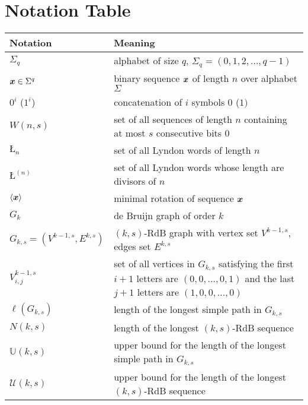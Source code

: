 \chapter*{Notation Table} 
\begin{center}
    \begin{tabular}{| m{2.5cm} | m{9cm} |}
     	\hline
     	\textbf{Notation} &\textbf{ Meaning}\\
     	\hline
     	$\Sigma_{q}$ & alphabet of size $q$, $\Sigma_{q}=(0,1,2,\ldots,q-1)$  \\  \hline
     	${\boldsymbol x}\in\Sigma^{q}$ & binary sequence ${\boldsymbol x}$ of length $n$ over alphabet $\Sigma$ \\ \hline
     	$0^{i}$ ($1^{i}$) & concatenation of $i$ symbols $0$ ($1)$ \\ \hline
     	$W(n,s)$ & set of all sequences of length $n$ containing at most $s$ consecutive bits $0$\\  \hline
     	$\text{\L}_{n}$ & set of all Lyndon words of length $n$ \\ \hline
     	$\text{\L}^{(n)}$ & set of all Lyndon words whose length are divisors of $n$ \\ \hline
     	$\langle{\boldsymbol x}\rangle$ & minimal rotation of sequence ${\boldsymbol x}$ \\ \hline
     	$G_{k}$ & de Bruijn graph of order $k$ \\  \hline
     	$G_{k,s} = (V^{k-1,s},E^{k,s})$ & $(k,s)$-RdB graph with vertex set $V^{k-1,s}$, edges set $E^{k,s}$  \\  \hline
     	$V^{k-1,s}_{i,j}$ & set of all vertices in $G_{k,s}$ satisfying the first $i+1$ letters are $(0,0,\ldots,0,1)$ and the last $j+1$ letters are $(1,0,0,\ldots,0)$ \\  \hline
     	$\ell(G_{k,s})$ & length of the longest simple path in $G_{k,s}$ \\ \hline
     	$N(k,s)$ & length of the longest $(k,s)$-RdB sequence \\ \hline
     	$\mathbb{U}(k,s)$ & upper bound for the length of the longest simple path in $G_{k,s}$ \\ \hline
     	$\mathcal{U}(k,s)$ & upper bound for the length of the longest $(k,s)$-RdB sequence \\ \hline
     	
     \end{tabular}   
\end{center}
 
